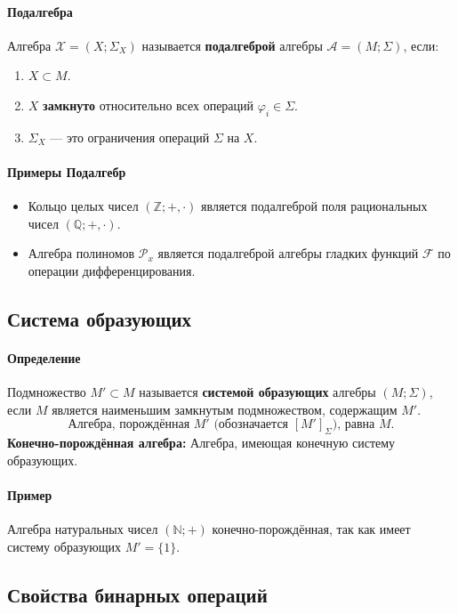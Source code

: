 \paragraph{Подалгебра}
Алгебра $\mathcal{X} = (X; \Sigma_X)$ называется \textbf{подалгеброй} алгебры $\mathcal{A} = (M; \Sigma)$, если:
\begin{enumerate}
    \item $X \subset M$.
    \item $X$ \textbf{замкнуто} относительно всех операций $\varphi_i \in \Sigma$.
    \item $\Sigma_X$ --- это ограничения операций $\Sigma$ на $X$.
\end{enumerate}

\paragraph{Примеры Подалгебр}
\begin{itemize}
    \item Кольцо целых чисел $(\mathbb{Z}; +, \cdot)$ является подалгеброй поля рациональных чисел $(\mathbb{Q}; +, \cdot)$.
    \item Алгебра полиномов $\mathcal{P}_x$ является подалгеброй алгебры гладких функций $\mathcal{F}$ по операции дифференцирования.
\end{itemize}

\subsection*{Система образующих}

\paragraph{Определение}
Подмножество $M' \subset M$ называется \textbf{системой образующих} алгебры $(M; \Sigma)$, если $M$ является наименьшим замкнутым подмножеством, содержащим $M'$.
$$\text{Алгебра, порождённая } M' \text{ (обозначается } [M']_\Sigma \text{), равна } M.$$
\textbf{Конечно-порождённая алгебра:} Алгебра, имеющая конечную систему образующих.

\paragraph{Пример}
Алгебра натуральных чисел $(\mathbb{N}; +)$ конечно-порождённая, так как имеет систему образующих $M' = \{1\}$.

\subsection*{Свойства бинарных операций}

